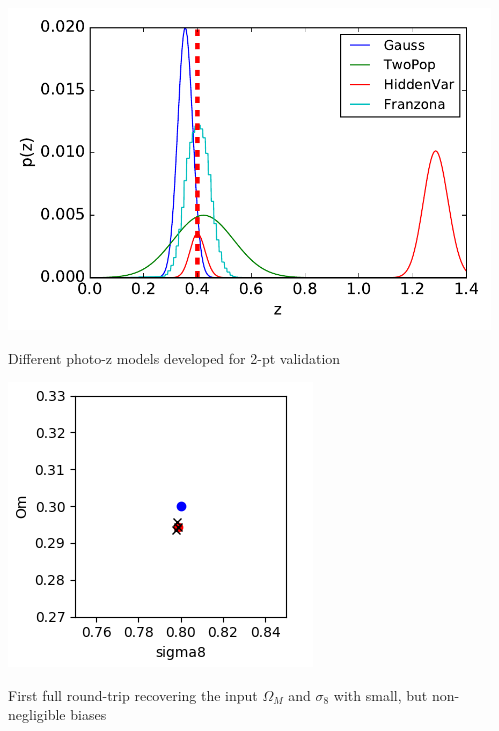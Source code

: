 \documentclass[aspectratio=169]{beamer}
\begin{document}
\begin{frame}
\begin{columns}
\begin{column}{8cm}
    \end{column}
    \begin{column}{5cm}
      \includegraphics[width=\linewidth]{./ptest04.pdf}
      \vspace*{-0.3cm}
      \begin{center}
        \tiny Different photo-z models developed for 2-pt validation
      \end{center}

      \begin{center}
        \includegraphics[width=0.6\linewidth]{./xx.png}

        \tiny First full round-trip recovering the input $\Omega_M$
        and $\sigma_8$ with small, but non-negligible biases

      \end{center}
    \end{column}
  \end{columns}
\end{frame}
\end{document}
